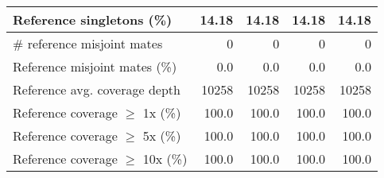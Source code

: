\documentclass[12pt,a4paper]{article}
\begin{document}
\begin{table}[ht]
\begin{center}
\begin{tabular}{|l*{4}{|r}|}
Reference singletons (\%) & 14.18 & 14.18 & 14.18 & 14.18 \\ \hline
\# reference misjoint mates & 0 & 0 & 0 & 0 \\ \hline
Reference misjoint mates (\%) & 0.0 & 0.0 & 0.0 & 0.0 \\ \hline
Reference avg. coverage depth & 10258 & 10258 & 10258 & 10258 \\ \hline
Reference coverage $\geq$ 1x (\%) & 100.0 & 100.0 & 100.0 & 100.0 \\ \hline
Reference coverage $\geq$ 5x (\%) & 100.0 & 100.0 & 100.0 & 100.0 \\ \hline
Reference coverage $\geq$ 10x (\%) & 100.0 & 100.0 & 100.0 & 100.0 \\ \hline
\end{tabular}
\end{center}
\end{table}
\end{document}

